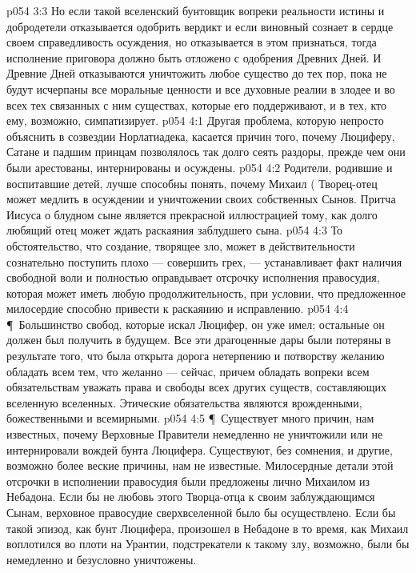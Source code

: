 \vs p054 3:3 Но если такой вселенский бунтовщик вопреки реальности истины и добродетели отказывается одобрить вердикт и если виновный сознает в сердце своем справедливость осуждения, но отказывается в этом признаться, тогда исполнение приговора должно быть отложено с одобрения Древних Дней. И Древние Дней отказываются уничтожить любое существо до тех пор, пока не будут исчерпаны все моральные ценности и все духовные реалии в злодее и во всех тех связанных с ним существах, которые его поддерживают, и в тех, кто ему, возможно, симпатизирует.
\vs p054 4:1 Другая проблема, которую непросто объяснить в созвездии Норлатиадека, касается причин того, почему Люциферу, Сатане и падшим принцам позволялось так долго сеять раздоры, прежде чем они были арестованы, интернированы и осуждены.
\vs p054 4:2 Родители, родившие и воспитавшие детей, лучше способны понять, почему Михаил ( Творец\hyp{}отец может медлить в осуждении и уничтожении своих собственных Сынов. Притча Иисуса о блудном сыне является прекрасной иллюстрацией тому, как долго любящий отец может ждать раскаяния заблудшего сына.
\vs p054 4:3 То обстоятельство, что создание, творящее зло, может в действительности сознательно поступить плохо --- совершить грех, --- устанавливает факт наличия свободной воли и полностью оправдывает отсрочку исполнения правосудия, которая может иметь любую продолжительность, при условии, что предложенное милосердие способно привести к раскаянию и исправлению.
\vs p054 4:4 \P\ Большинство свобод, которые искал Люцифер, он уже имел; остальные он должен был получить в будущем. Все эти драгоценные дары были потеряны в результате того, что была открыта дорога нетерпению и потворству желанию обладать всем тем, что желанно --- сейчас, причем обладать вопреки всем обязательствам уважать права и свободы всех других существ, составляющих вселенную вселенных. Этические обязательства являются врожденными, божественными и всемирными.
\vs p054 4:5 \P\ Существует много причин, нам известных, почему Верховные Правители немедленно не уничтожили или не интернировали вождей бунта Люцифера. Существуют, без сомнения, и другие, возможно более веские причины, нам не известные. Милосердные детали этой отсрочки в исполнении правосудия были предложены лично Михаилом из Небадона. Если бы не любовь этого Творца\hyp{}отца к своим заблуждающимся Сынам, верховное правосудие сверхвселенной было бы осуществлено. Если бы такой эпизод, как бунт Люцифера, произошел в Небадоне в то время, как Михаил воплотился во плоти на Урантии, подстрекатели к такому злу, возможно, были бы немедленно и безусловно уничтожены.
